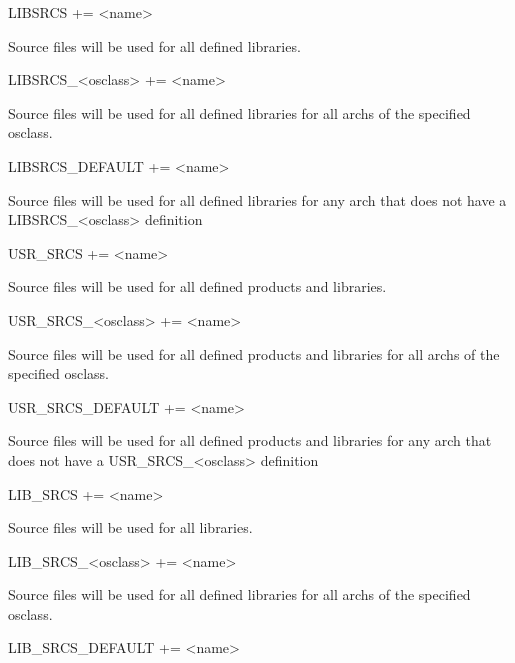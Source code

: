 \begin{description}

\item {}LIBSRCS += \textless{}name\textgreater{}

Source files will be used for all defined libraries.

\item LIBSRCS\_\textless{}osclass\textgreater{} += \textless{}name\textgreater{}

Source files will be used for all defined libraries for all archs of the specified osclass.

\item LIBSRCS\_DEFAULT += \textless{}name\textgreater{}

Source files will be used for all defined libraries for any arch that does not have a LIBSRCS\_\textless{}osclass\textgreater{} 
definition

\item {}USR\_SRCS += \textless{}name\textgreater{}

Source files will be used for all defined products and libraries.

\item

\item USR\_SRCS\_\textless{}osclass\textgreater{} += \textless{}name\textgreater{}

Source files will be used for all defined products and libraries for all archs of the specified osclass.

\item USR\_SRCS\_DEFAULT += \textless{}name\textgreater{}

Source files will be used for all defined products and libraries for any arch that does not have a 
USR\_SRCS\_\textless{}osclass\textgreater{} definition

\item {}LIB\_SRCS += \textless{}name\textgreater{}

Source files will be used for all libraries.

\item LIB\_SRCS\_\textless{}osclass\textgreater{} += \textless{}name\textgreater{}

Source files will be used for all defined libraries for all archs of the specified osclass.

\item LIB\_SRCS\_DEFAULT += \textless{}name\textgreater{}


\end{description}
